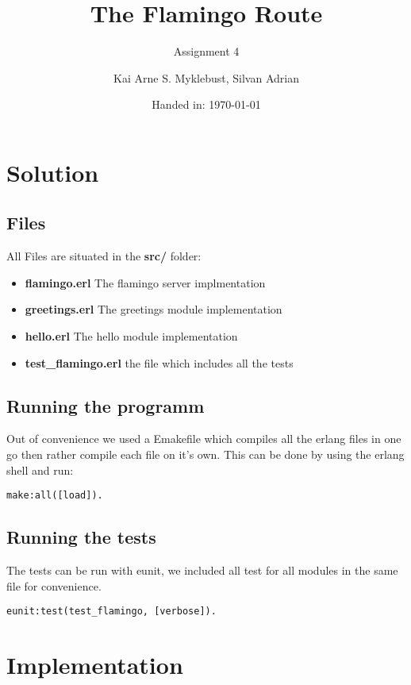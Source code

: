 \documentclass[12pt,a4paper]{article}
\begin{document}
\title{The Flamingo Route}
\subtitle{Assignment 4}

\author{Kai Arne S. Myklebust, Silvan Adrian}
\date{Handed in: \today}
	
\maketitle
\tableofcontents

\section{Solution}

\subsection{Files}
All Files are situated in the \textbf{src/} folder:
\begin{itemize}
	\item \textbf{flamingo.erl} The flamingo server implmentation
	\item \textbf{greetings.erl} The greetings module implementation
	\item \textbf{hello.erl} The hello module implementation
	\item \textbf{test\_flamingo.erl} the file which includes all the tests
\end{itemize}

\subsection{Running the programm}
Out of convenience we used a Emakefile which compiles all the erlang files in one go then rather compile each file on it's own.
This can be done by using the erlang shell and run:

\begin{verbatim}
make:all([load]).
\end{verbatim}

\subsection{Running the tests}
The tests can be run with eunit, we included all test for all modules in the same file for convenience.

\begin{verbatim}
eunit:test(test_flamingo, [verbose]).
\end{verbatim}

\section{Implementation}
\end{document}
